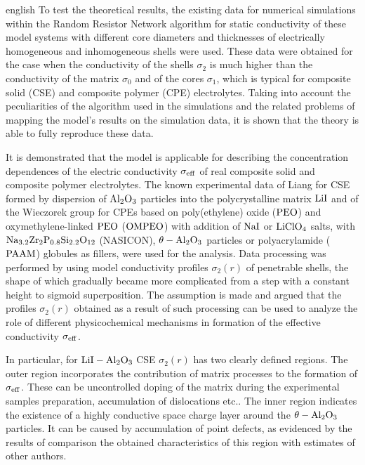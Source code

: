 \begin{otherlanguage*}{english}
To test the theoretical results, the existing data for numerical simulations within the Random Resistor Network algorithm for static conductivity of these model systems with different core diameters and thicknesses of electrically homogeneous and inhomogeneous shells were used. These data were obtained for the case when the conductivity of the shells $ \sigma_2 $ is much higher than the conductivity of the matrix $ \sigma_0 $ and of the cores $ \sigma_1 $, which is typical for composite solid (CSE) and composite polymer  (CPE) electrolytes.
Taking into account the peculiarities of the algorithm used in the simulations and the related problems of mapping the model's results on the simulation data, it is shown that the theory is able to fully reproduce these data.

It is demonstrated that the model is applicable for describing the concentration dependences of the electric conductivity $ \sigma_ {\rm eff} $ of real  composite solid and composite  polymer electrolytes.
The known experimental data of Liang for CSE formed by dispersion of  $ \rm Al_2O_3 $ particles into the polycrystalline matrix $ \rm LiI $ and of the Wieczorek group for CPEs based on poly(ethylene) oxide ($ \rm PEO $) and oxymethylene-linked  $ \rm PEO $ ($ \rm OMPEO $) with addition of $ \rm NaI $ or $ \rm LiClO_4 $ salts, with $ \rm Na_ {3.2} Zr_2P_ {0.8} Si_ { 2.2} O_ {12} $ (NASICON), $ \rm \theta-Al_2O_3 $ particles  or polyacrylamide ($ \rm PAAM $) globules as fillers,  were used for the analysis.
Data processing was performed by using model conductivity profiles $ \sigma_2 (r) $ of penetrable shells, the shape of which gradually became more complicated from a step with a constant height to sigmoid superposition.
The assumption is made and argued that the profiles $ \sigma_2 (r) $ obtained as a result of such processing can be used to analyze the role of different physicochemical mechanisms in formation of the effective conductivity $ \sigma_ {\rm eff} $.

In particular, for $ \rm LiI-Al_2O_3 $ CSE $ \sigma_2 (r) $ has two clearly defined regions. The outer region incorporates the contribution of matrix processes to the formation of $ \sigma _ {\rm eff} $. These can be uncontrolled doping of the matrix during the  experimental samples preparation, accumulation of dislocations etc.. The inner region indicates the existence of a highly conductive space charge layer around the $ \rm \theta-Al_2O_3 $ particles. It can be caused by accumulation of point defects, as evidenced by the results of comparison the obtained characteristics of this region with estimates of other authors.


\end{otherlanguage*}
